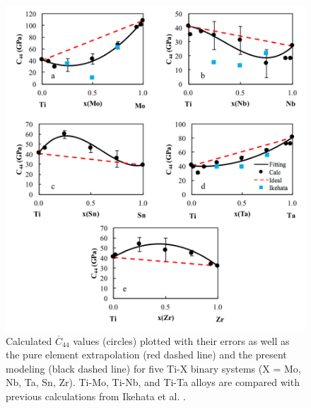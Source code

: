 \pagebreak
\begin{figure}[H]
	\centering
	\includegraphics[width=\textwidth]{Chapter-5/Figures/tixc44.png}
	\caption{Calculated $\overline{C}_{44}$ values (circles) plotted with their errors as well as the pure element extrapolation (red dashed line) and the present modeling (black dashed line) for five Ti-X binary systems (X = Mo, Nb, Ta, Sn, Zr). Ti-Mo, Ti-Nb, and Ti-Ta alloys are compared with previous calculations from Ikehata et al. \cite{Ikehata2004}.}
	\label{Ch5-figure:tixc44}
\end{figure}

